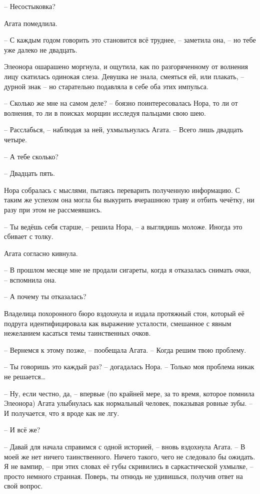 \documentclass[
  a5paperpaper,
  DIV=11,
  numbers=noendperiod]{scrreprt}
\begin{document}
-- Несостыковка?

Агата помедлила.

-- С каждым годом говорить это становится всё труднее, -- заметила она,
-- но тебе уже далеко не двадцать.

Элеонора ошарашено моргнула, и ощутила, как по разгоряченному от
волнения лицу скатилась одинокая слеза. Девушка не знала, смеяться ей,
или плакать, -- дурной знак -- но старательно подавляла в себе оба этих
импульса.

-- Сколько же мне на самом деле? -- боязно поинтересовалась Нора, то ли
от волнения, то ли в поисках морщин исследуя пальцами свою шею.

-- Расслабься, -- наблюдая за ней, ухмыльнулась Агата. -- Всего лишь
двадцать четыре.

-- А тебе сколько?

-- Двадцать пять.

Нора собралась с мыслями, пытаясь переварить полученную информацию. С
таким же успехом она могла бы выкурить вчерашнюю траву и отбить чечётку,
ни разу при этом не рассмеявшись.

-- Ты ведёшь себя старше, -- решила Нора, -- а выглядишь моложе. Иногда
это сбивает с толку.

Агата согласно кивнула.

-- В прошлом месяце мне не продали сигареты, когда я отказалась снимать
очки, -- вспомнила она.

-- А почему ты отказалась?

Владелица похоронного бюро вздохнула и издала протяжный стон, который её
подруга идентифицировала как выражение усталости, смешанное с явным
нежеланием касаться темы таинственных очков.

-- Вернемся к этому позже, -- пообещала Агата. -- Когда решим твою
проблему.

-- Ты говоришь это каждый раз? -- догадалась Нора. -- Только моя
проблема никак не решается\ldots{}

-- Ну, если честно, да, -- впервые (по крайней мере, за то время,
которое помнила Элеонора) Агата улыбнулась как нормальный человек,
показывая ровные зубы. -- И получается, что я вроде как не лгу.

-- И всё же?

-- Давай для начала справимся с одной историей, -- вновь вздохнула
Агата. -- В моей же нет ничего таинственного. Ничего такого, чего не
следовало бы ожидать. Я не вампир, -- при этих словах её губы скривились
в саркастической ухмылке, -- просто немного странная. Поверь, ты отнюдь
не удивишься, получив ответ на свой вопрос.
\end{document}
